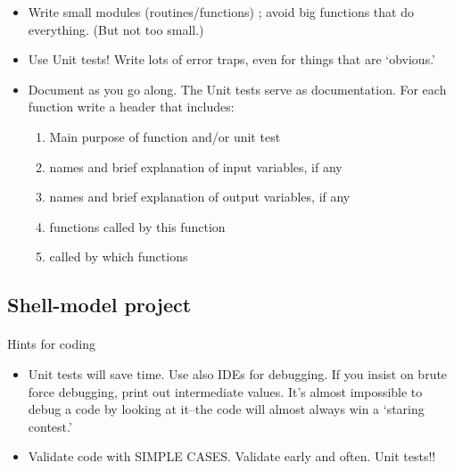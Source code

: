 \begin{itemize}
\item Write small modules (routines/functions) ; avoid big functions  that do everything. (But not too small.)

\item Use Unit tests! Write lots of error traps, even for things that are `obvious.'

\item Document as you go along. The Unit tests serve as documentation. For each function write a header that includes: 
\begin{enumerate}

\item Main purpose of function and/or unit test

\item names and  brief explanation of input variables, if any 

\item names and brief explanation of output variables, if any

\item functions called by this function

\item called by which functions
\end{enumerate}

\noindent
\end{itemize}

\noindent



\subsection*{Shell-model project}

\paragraph{}

Hints for coding

\begin{itemize}
\item Unit tests will save time. Use also IDEs for debugging. If you insist on brute force debugging, print out intermediate values. It's almost impossible to debug a  code by looking at it--the code will almost always win a `staring contest.'

\item Validate code with SIMPLE CASES. Validate early and often.  Unit tests!! 
\end{itemize}

